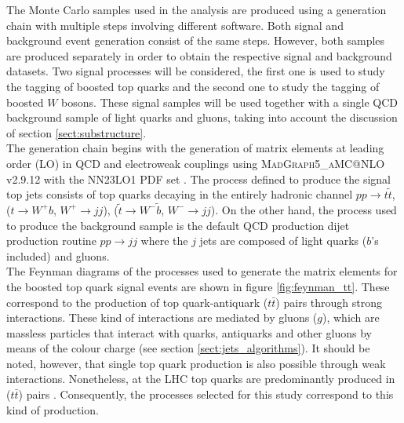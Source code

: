 \documentclass[main]{subfiles} %
\begin{document}


\doublespacing


\vspace{20pt}

The Monte Carlo samples used in the analysis are produced using a generation chain with multiple steps involving different software. Both signal and background event generation consist of the same steps. However, both samples are produced separately in order to obtain the respective signal and background datasets. Two signal processes will be considered, the first one is used to study the tagging of boosted top quarks and the second one to study the tagging of boosted $W$ bosons. These signal samples will be used together with a single QCD background sample of light quarks and gluons, taking into account the discussion of section \ref{sect:substructure}.\\

The generation chain begins with the generation of matrix elements at leading order (LO) in QCD and electroweak couplings using \textsc{MadGraph5\_aMC@NLO} v2.9.12 \cite{Alwall2014} with the \textsc{NN23LO1} PDF set \cite{Ball2017}. The process defined to produce the signal top jets consists of top quarks decaying in the entirely hadronic channel $pp \rightarrow t \tilde{t}$, ($t \rightarrow W^+ b$, $W^+ \rightarrow jj$), ($\tilde{t} \rightarrow W^- \tilde{b}$, $W^- \rightarrow jj$). On the other hand, the process used to produce the background sample is the default QCD production dijet production routine $pp \rightarrow jj$ where the $j$ jets are composed of light quarks ($b$'s included) and gluons.\\

The Feynman diagrams of the processes used to generate the matrix elements for the boosted top quark signal events are shown in figure \ref{fig:feynman_tt}. These correspond to the production of top quark-antiquark ($t\bar{t}$) pairs through strong interactions. These kind of interactions are mediated by gluons ($g$), which are massless particles that interact with quarks, antiquarks and other gluons by means of the colour charge (see section \ref{sect:jets_algorithms}). It should be noted, however, that single top quark production is also possible through weak interactions. Nonetheless, at the LHC top quarks are predominantly produced in ($t\bar{t}$) pairs \cite{deJong2009}. Consequently, the processes selected for this study correspond to this kind of production. \\
\end{document}
